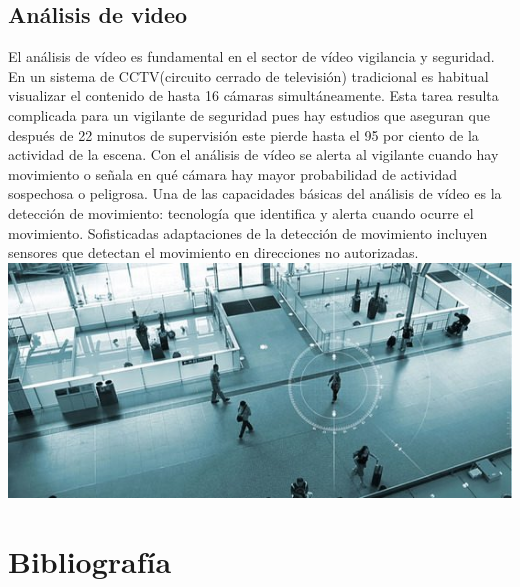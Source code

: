 \documentclass[twocolumn]{article}
\begin{document}
\subsection{Análisis de video}
El análisis de vídeo es fundamental en el sector de vídeo vigilancia y seguridad. En un sistema de CCTV(circuito cerrado de televisión) tradicional es habitual visualizar el contenido de hasta 16 cámaras simultáneamente. Esta tarea resulta complicada para un vigilante de seguridad pues hay estudios que aseguran que después de 22 minutos de supervisión este pierde hasta el 95 por ciento de la actividad de la escena. Con el análisis de vídeo se alerta al vigilante cuando hay movimiento o señala en qué cámara hay mayor probabilidad de actividad sospechosa o peligrosa.
Una de las capacidades básicas del análisis de vídeo es la detección de movimiento: tecnología que identifica y alerta cuando ocurre el movimiento. Sofisticadas adaptaciones de la detección de movimiento incluyen sensores que detectan el movimiento en direcciones no autorizadas.
\\
\includegraphics[width=1.02\linewidth]{img/video.jpg}
\section{Bibliografía}
\end{document}

